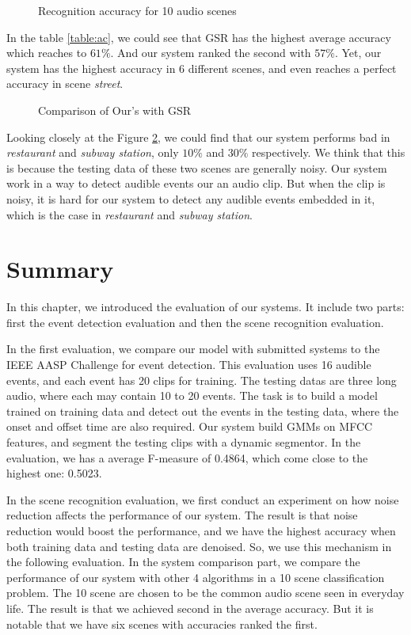\begin{figure}[htb!]
\centering

\caption{Recognition accuracy for 10 audio scenes}
\label{fig:sceneeval}
\end{figure}

In the table \ref{table:ac}, we could see that GSR has the highest average accuracy which reaches to $61\%$. 
And our system ranked the second with $57\%$. 
Yet, our system has the highest accuracy in 6 different scenes, and even reaches a perfect accuracy in scene \textit{street}. 

\begin{figure}[htb!]
\centering

\caption{Comparison of Our's with GSR}
\label{fig:ourgsr}
\end{figure}

Looking closely at the Figure \ref{fig:ourgsr}, we could find that our system performs bad in \textit{restaurant} and \textit{subway station}, only $10\%$ and $30\%$ respectively. 
We think that this is because the testing data of these two scenes are generally noisy. 
Our system work in a way to detect audible events our an audio clip. 
But when the clip is noisy, it is hard for our system to detect any audible events embedded in it, which is the case in \textit{restaurant} and \textit{subway station}. 


\cleardoublepage{}
\section{Summary}
In this chapter, we introduced the evaluation of our systems. 
It include two parts: first the event detection evaluation and then the scene recognition evaluation.

In the first evaluation, we compare our model with submitted systems to the IEEE AASP Challenge for event detection. 
This evaluation uses 16 audible events, and each event has 20 clips for training. 
The testing datas are three long audio, where each may contain 10 to 20 events. 
The task is to build a model trained on training data and detect out the events in the testing data, where the onset and offset time are also required. 
Our system build GMMs on MFCC features, and segment the testing clips with a dynamic segmentor. 
In the evaluation, we has a average F-measure of 0.4864, which come close to the highest one: 0.5023. 

In the scene recognition evaluation, we first conduct an experiment on how noise reduction affects the performance of our system. 
The result is that noise reduction would boost the performance, and we have the highest accuracy when both training data and testing data are denoised. 
So, we use this mechanism in the following evaluation. 
In the system comparison part, we compare the performance of our system with other 4 algorithms in a 10 scene classification problem. 
The 10 scene are chosen to be the common audio scene seen in everyday life. 
The result is that we achieved second in the average accuracy. 
But it is notable that we have six scenes with accuracies ranked the first.  
